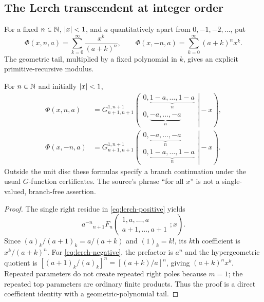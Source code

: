 \subsection{The Lerch transcendent at integer order}

For a fixed $n\in\mathbb N$, $\left|x\right|<1$, and $a$ quantitatively apart from
$0,-1,-2,\ldots$, put
\[
 \Phi(x,n,a)=\sum_{k=0}^\infty\frac{x^k}{(a+k)^n},
 \qquad
 \Phi(x,-n,a)=\sum_{k=0}^\infty(a+k)^n x^k.
\]
The geometric tail, multiplied by a fixed polynomial in $k$, gives an explicit
primitive-recursive modulus.

\begin{theorem}\label{thm:lerch-g}
For $n\in\mathbb N$ and initially $\left|x\right|<1$,
\begin{align}
 \Phi(x,n,a)
 &=G_{n+1,n+1}^{1,n+1}\!\left(
 \left.\begin{matrix}0,\underbrace{1-a,\ldots,1-a}_{n}\\
 0,\underbrace{-a,\ldots,-a}_{n}\end{matrix}\right|-x\right),
 \label{eq:lerch-positive}\\
 \Phi(x,-n,a)
 &=G_{n+1,n+1}^{1,n+1}\!\left(
 \left.\begin{matrix}0,\underbrace{-a,\ldots,-a}_{n}\\
 0,\underbrace{1-a,\ldots,1-a}_{n}\end{matrix}\right|-x\right).
 \label{eq:lerch-negative}
\end{align}
Outside the unit disc these formulas specify a branch continuation under the
usual $G$-function certificates.  The source's phrase ``for all $x$'' is not a
single-valued, branch-free assertion.
\end{theorem}
\begin{proof}
The single right residue in \eqref{eq:lerch-positive} yields
\[
 a^{-n}{}_{n+1}F_n\!\left(
 \begin{matrix}1,a,\ldots,a\\a+1,\ldots,a+1\end{matrix};x\right).
\]
Since $(a)_k/(a+1)_k=a/(a+k)$ and $(1)_k=k!$, its $k$th coefficient is
$x^k/(a+k)^n$.  For \eqref{eq:lerch-negative}, the prefactor is $a^n$ and the
hypergeometric quotient is
$[(a+1)_k/(a)_k]^n=[(a+k)/a]^n$, giving $(a+k)^nx^k$.  Repeated parameters do
not create repeated right poles because $m=1$; the repeated top parameters are
ordinary finite products.  Thus the proof is a direct coefficient identity
with a geometric-polynomial tail.
\end{proof}


